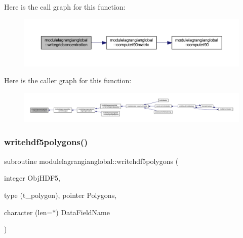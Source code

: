 Here is the call graph for this function\+:\nopagebreak
\begin{figure}[H]
\begin{center}
\leavevmode
\includegraphics[width=350pt]{namespacemodulelagrangianglobal_a071a32ced5fdfb667319483a8fd208b7_cgraph}
\end{center}
\end{figure}
Here is the caller graph for this function\+:\nopagebreak
\begin{figure}[H]
\begin{center}
\leavevmode
\includegraphics[width=350pt]{namespacemodulelagrangianglobal_a071a32ced5fdfb667319483a8fd208b7_icgraph}
\end{center}
\end{figure}
\mbox{\label{namespacemodulelagrangianglobal_a123df5d7675f21137327cf36ed875f91}} 
\subsubsection{\texorpdfstring{writehdf5polygons()}{writehdf5polygons()}}
{\footnotesize\ttfamily subroutine modulelagrangianglobal\+::writehdf5polygons (\begin{DoxyParamCaption}\item[{integer}]{Obj\+H\+D\+F5,  }\item[{type (t\+\_\+polygon), pointer}]{Polygons,  }\item[{character (len=$\ast$)}]{Data\+Field\+Name }\end{DoxyParamCaption})\hspace{0.3cm}{\ttfamily [private]}}

